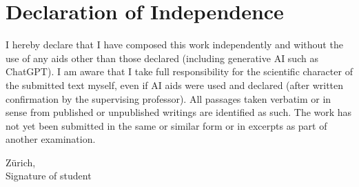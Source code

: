 \chapter*{Declaration of Independence}
I hereby declare that I have composed this work independently and without the use of any aids other than those declared (including generative AI such as ChatGPT). I am aware that I take full responsibility for the scientific character of the submitted text myself, even if AI aids were used and declared (after written confirmation by the supervising professor). All passages taken verbatim or in sense from published or unpublished writings are identified as such. The work has not yet been submitted in the same or similar form or in excerpts as part of another examination.

\vspace{2cm}

Zürich, \hspace{5cm} \hrulefill \\
\hspace*{6.4cm} Signature of student